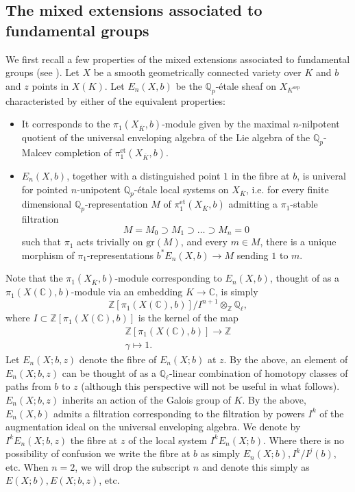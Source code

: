 \documentclass[11pt]{amsart}
\def\Z{\mathbb Z}
\def\Q{\mathbb Q}
\newcommand{\sep}{\mathrm{sep}}
\newcommand{\gr}{\mathrm{gr}}
\theoremstyle{plain}
\theoremstyle{definition}
\newcommand{\et}{\mathrm{et}}
\begin{document}
\subsection{The mixed extensions associated to fundamental groups}
We first recall a few properties of the mixed extensions associated to fundamental groups (see \cite[\S 3]{DG}). Let $X$ be a smooth geometrically connected variety over $K$ and $b$ and $z$ points in $X(K)$. Let $E_n (X,b)$ be the $\Q _p $-\'etale sheaf on $X_{K^{\sep }}$ characteristed by either of the equivalent properties:
\begin{itemize}
\item It corresponds to the $\pi _1 (X_{\overline{K}},b)$-module given by the maximal $n$-nilpotent quotient of the universal enveloping algebra of the Lie algebra of the $\Q _p $-Malcev completion of $\pi ^{\et }_1 (X_{\overline{K}},b)$.
\item $E_n (X,b)$, together with a distinguished point $1$ in the fibre at $b$, is univeral for pointed $n$-unipotent $\Q _p $-\'etale local systems on $X_{\overline{K}}$, i.e. for every finite dimensional $\Q _p $-representation $M$ of $\pi _1 ^{\et }(X_{\overline{K}},b)$ admitting a $\pi _1 $-stable filtration
\[
M=M_0 \supset M_1 \supset \ldots \supset M_n =0
\]
such that $\pi _1 $ acts trivially on $\gr (M)$, and every $m\in M$, there is a unique morphism of $\pi _1 $-representations $b^* E_n (X,b)\to M$ sending $1$ to $m$.
\end{itemize}
Note that the $\pi _1 (X_{\overline{K}},b)$-module corresponding to $E_n (X,b)$, thought of as a $\pi _1 (X(\mathbb{C}),b)$-module via an embedding $K\to \mathbb{C}$, is simply 
\[
\Z [\pi _1 (X(\mathbb{C}),b)]/I^{n+1} \otimes _{\Z }\Q _{\ell },
\]
where $I\subset \Z [\pi _1 (X(\mathbb{C}),b)]$ is the kernel of the map
\begin{align*}
\Z [\pi _1 (X(\mathbb{C}),b)]\to \Z \\
\gamma \mapsto 1.
\end{align*}
Let $E_n (X;b,z)$ denote the fibre of $E_n (X;b)$ at $z$. By the above, an element of $E_n (X;b,z)$ can be thought of as a $\Q _{\ell }$-linear combination of homotopy classes of paths from $b$ to $z$ (although this perspective will not be useful in what follows). $E_n (X;b,z)$ inherits an action of the Galois group of $K$. By the above, $E_n (X,b)$ admits a filtration corresponding to the filtration by powers $I^k$ of the augmentation ideal on the universal enveloping algebra. We denote by $I^k E_n (X;b,z)$ the fibre at $z$ of the local system $I^k E_n (X;b)$. Where there is no possibility of confusion we write the fibre at $b$ as simply $E_n (X;b), I^k /I^j (b)$, etc. When $n=2$, we will drop the subscript $n$ and denote this simply as $E(X;b),E(X;b,z)$, etc.
\end{document}
